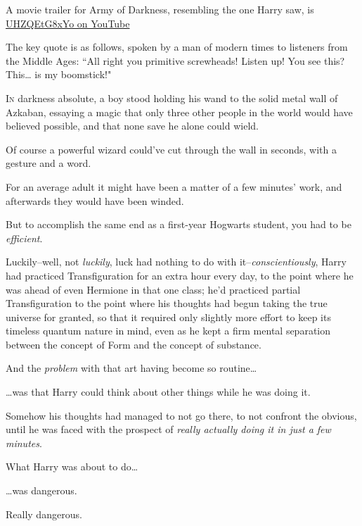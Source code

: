 
\begin{chapterOpeningAuthorNote}
A movie trailer for Army of Darkness, resembling the one Harry saw, is \href{https://www.youtube.com/watch?v=UHZQEtG8xYo}{UHZQEtG8xYo on YouTube}

The key quote is as follows, spoken by a man of modern times to listeners from the Middle Ages:
``All right you primitive screwheads! Listen up! You see this? This{\ldots} is my boomstick!"
\end{chapterOpeningAuthorNote}

\lettrine{I}{n} darkness absolute, a boy stood holding his wand to the solid metal wall of Azkaban, essaying a magic that only three other people in the world would have believed possible, and that none save he alone could wield.

Of course a powerful wizard could've cut through the wall in seconds, with a gesture and a word.

For an average adult it might have been a matter of a few minutes' work, and afterwards they would have been winded.

But to accomplish the same end as a first-year Hogwarts student, you had to be \emph{efficient}.

Luckily\---well, not \emph{luckily}, luck had nothing to do with it\---\emph{conscientiously}, Harry had practiced Transfiguration for an extra hour every day, to the point where he was ahead of even Hermione in that one class; he'd practiced partial Transfiguration to the point where his thoughts had begun taking the true universe for granted, so that it required only slightly more effort to keep its timeless quantum nature in mind, even as he kept a firm mental separation between the concept of Form and the concept of substance.

And the \emph{problem} with that art having become so routine{\ldots}

{\ldots}was that Harry could think about other things while he was doing it.

Somehow his thoughts had managed to not go there, to not confront the obvious, until he was faced with the prospect of \emph{really actually doing it in just a few minutes}.

What Harry was about to do{\ldots}

{\ldots}was dangerous.

Really dangerous.

